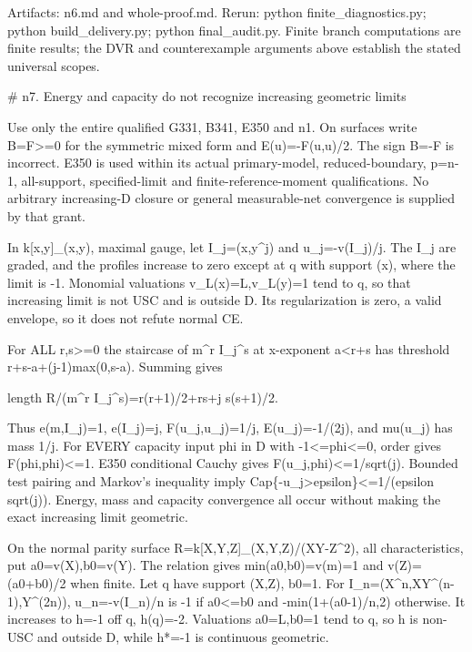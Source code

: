 \documentclass[11pt]{article}
\begin{document}
Artifacts: n6.md and whole-proof.md. Rerun: python finite\_diagnostics.py; python build\_delivery.py; python final\_audit.py. Finite branch computations are finite results; the DVR and counterexample arguments above establish the stated universal scopes.

 \# n7. Energy and capacity do not recognize increasing geometric limits

Use only the entire qualified G331, B341, E350 and n1. On surfaces write B=F>=0 for the symmetric mixed form and E(u)=-F(u,u)/2. The sign B=-F is incorrect. E350 is used within its actual primary-model, reduced-boundary, p=n-1, all-support, specified-limit and finite-reference-moment qualifications. No arbitrary increasing-D closure or general measurable-net convergence is supplied by that grant.

In k[x,y]\_(x,y), maximal gauge, let I\_j=(x,y\textasciicircum{}j) and u\_j=-v(I\_j)/j. The I\_j are graded, and the profiles increase to zero except at q with support (x), where the limit is -1. Monomial valuations v\_L(x)=L,v\_L(y)=1 tend to q, so that increasing limit is not USC and is outside D. Its regularization is zero, a valid envelope, so it does not refute normal CE.

For ALL r,s>=0 the staircase of m\textasciicircum{}r I\_j\textasciicircum{}s at x-exponent a<r+s has threshold r+s-a+(j-1)max(0,s-a). Summing gives

length R/(m\textasciicircum{}r I\_j\textasciicircum{}s)=r(r+1)/2+rs+j s(s+1)/2.

Thus e(m,I\_j)=1, e(I\_j)=j, F(u\_j,u\_j)=1/j, E(u\_j)=-1/(2j), and mu(u\_j) has mass 1/j. For EVERY capacity input phi in D with -1<=phi<=0, order gives F(phi,phi)<=1. E350 conditional Cauchy gives F(u\_j,phi)<=1/sqrt(j). Bounded test pairing and Markov's inequality imply Cap\{-u\_j>epsilon\}<=1/(epsilon sqrt(j)). Energy, mass and capacity convergence all occur without making the exact increasing limit geometric.

On the normal parity surface R=k[X,Y,Z]\_(X,Y,Z)/(XY-Z\textasciicircum{}2), all characteristics, put a0=v(X),b0=v(Y). The relation gives min(a0,b0)=v(m)=1 and v(Z)=(a0+b0)/2 when finite. Let q have support (X,Z), b0=1. For I\_n=(X\textasciicircum{}n,XY\textasciicircum{}(n-1),Y\textasciicircum{}(2n)), u\_n=-v(I\_n)/n is -1 if a0<=b0 and -min(1+(a0-1)/n,2) otherwise. It increases to h=-1 off q, h(q)=-2. Valuations a0=L,b0=1 tend to q, so h is non-USC and outside D, while h*=-1 is continuous geometric.
\end{document}
